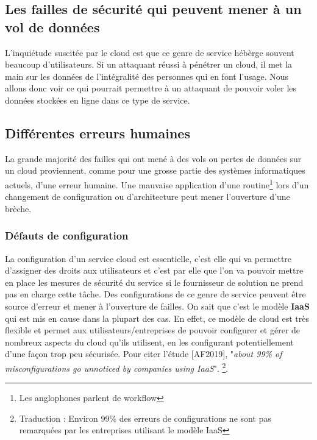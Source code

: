 \documentclass[a4paper, 12pt]{article}
\begin{document}
\begin{spacing}{1.1}
  \section{Les failles de sécurité qui peuvent mener à un vol de données}
    L'inquiétude suscitée par le cloud est que ce genre de service hébèrge
    souvent beaucoup d'utilisateurs. Si un attaquant réussi à pénétrer un cloud,
    il met la main sur les données de l'intégralité des personnes qui en font
    l'usage. Nous allons donc voir ce qui pourrait permettre à un attaquant de
    pouvoir voler les données stockées en ligne dans ce type de service.

    \subsection{Différentes erreurs humaines}
      La grande majorité des failles qui ont mené à des vols ou pertes de
      données sur un cloud proviennent, comme pour une grosse partie des
      systèmes informatiques actuels, d'une erreur humaine. Une mauvaise
      application d'une routine\footnote{Les anglophones parlent de workflow}
      lors d'un changement de configuration ou d'architecture peut mener
      l'ouverture d'une brèche.

      \subsubsection{Défauts de configuration}
        La configuration d'un service cloud est essentielle, c'est elle qui va
        permettre d'assigner des droits aux utilisateurs et c'est par elle que
        l'on va pouvoir mettre en place les mesures de sécurité du service si le
        fournisseur de solution ne prend pas en charge cette tâche. Des
        configurations de ce genre de service peuvent être source d'erreur et
        mener à l'ouverture de failles. On sait que c'est le modèle
        \textbf{IaaS} qui est mis en cause dans la plupart des cas. En effet, ce
        modèle de cloud est très flexible et permet aux utilisateurs/entreprises
        de pouvoir configurer et gérer de nombreux aspects du cloud qu'ils
        utilisent, en les configurant potentiellement d'une façon trop peu
        sécurisée. Pour citer l'étude [AF2019], "\textit{about 99\% of
        misconfigurations go unnoticed by companies using IaaS}".
        \footnote{Traduction : Environ 99\% des erreurs de configurations ne
        sont pas remarquées par les entreprises utilisant le modèle IaaS}.


\end{spacing}
\end{document}
